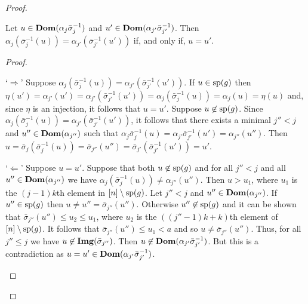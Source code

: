 \documentclass[../main/thesis.tex]{subfiles}
\begin{document}
\begin{proof}
  \begin{claim}
    Let $u \in \text{\textbf{Dom}}(\alpha_j \bar{\sigma}^{-1}_j)$ and $u' \in
    \text{\textbf{Dom}}(\alpha_{j'}\bar{\sigma}^{-1}_{j'})$. Then $\alpha_j
    (\bar{\sigma}^{-1}_j(u)) = \alpha_{j'}(\bar{\sigma}^{-1}_{j'}(u'))$ if, and
    only if, $u = u'$.
    \label{claim:compatibility}
  \end{claim}
  \begin{proof}
    \begin{myenum}
    \item[`$\Rightarrow$'] Suppose $\alpha_j (\bar{\sigma}^{-1}_j(u)) =
      \alpha_{j'}(\bar{\sigma}^{-1}_{j'}(u'))$. If $u \in \text{sp}(g)$ then
      $\eta(u') = \alpha_{j'}(u') = \alpha_{j'} (\bar{\sigma}^{-1}_{j'}(u')) =
      \alpha_j (\bar{\sigma}^{-1}_j(u)) = \alpha_j(u) = \eta (u)$ and, since
      $\eta$ is an injection, it follows that $u = u'$. Suppose $u \not\in
      \text{sp}(g)$. Since $\alpha_{j}(\bar{\sigma}^{-1}_{j}(u)) =
      \alpha_{j'}(\bar{\sigma}^{-1}_{j'}(u'))$, it follows that there exists a
      minimal $j'' < j$ and $u'' \in \text{\textbf{Dom}}(\alpha_{j''})$ such that $
      \alpha_{j}\bar{\sigma}^{-1}_{j}(u) = \alpha_{j'}
      \bar{\sigma}^{-1}_{j'}(u') = \alpha_{j''}(u'')$. Then $u =
      \bar{\sigma}_j(\bar{\sigma}^{-1}_j (u)) = \bar{\sigma}_{j''}(u'') =
      \bar{\sigma}_{j'}(\bar{\sigma}^{-1}_{j'} (u')) = u'$.

    \item[`$\Leftarrow$'] Suppose $u = u'$. Suppose that both $u \not\in
      \text{sp}(g)$ and for all $j'' < j$ and all $u'' \in \text{\textbf{Dom}}(\alpha_{j''})$ we
      have $\alpha_j(\bar{\sigma}^{-1}_j(u)) \neq \alpha_{j''}(u'')$. Then $u >
      u_1$, where $u_1$ is the $(j-1)k$th element in $[n] \setminus \text{sp}(g)$.
      Let $j'' < j$ and $u'' \in \text{\textbf{Dom}}(\alpha_{j''})$. If $u'' \in \text{sp}(g)$
      then $u \neq u'' = \bar{\sigma}_{j''}(u'')$. Otherwise $u'' \not\in
      \text{sp}(g)$ and it can be shown that $\bar{\sigma}_{j''}(u'') \leq u_2 \leq
      u_1$, where $u_2$ is the $((j'' - 1)k + k)$th element of $[n] \setminus
      \text{sp}(g)$. It follows that $\bar{\sigma}_{j''}(u'') \leq u_1< a$ and so
      $u \neq \bar{\sigma}_{j''}(u'')$. Thus, for all $j'' \leq j$ we have $u
      \not\in \text{\textbf{Img}}(\bar{\sigma}_{j''})$. Then $u \not\in \text{\textbf{Dom}}(\alpha_{j'}
      \bar{\sigma}^{-1}_{j'})$. But this is a contradiction as $u = u' \in
      \text{\textbf{Dom}}(\alpha_{j'} \bar{\sigma}^{-1}_{j'})$.


\end{myenum}
\end{proof}
\end{proof}
\end{document}
